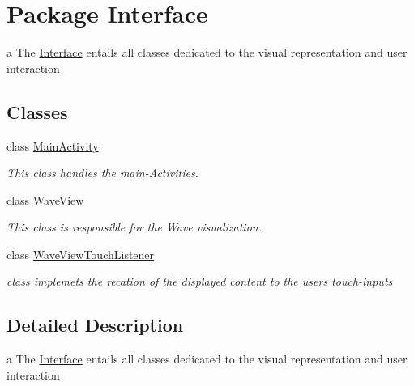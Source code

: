 \hypertarget{namespaceInterface}{}\section{Package Interface}
\label{namespaceInterface}


a The \hyperlink{namespaceInterface}{Interface} entails all classes dedicated to the visual representation and user interaction  


\subsection*{Classes}
\begin{DoxyCompactItemize}
\item 
class \hyperlink{classInterface_1_1MainActivity}{Main\+Activity}
\begin{DoxyCompactList}\small\item\em This class handles the main-\/\+Activities. \end{DoxyCompactList}\item 
class \hyperlink{classInterface_1_1WaveView}{Wave\+View}
\begin{DoxyCompactList}\small\item\em This class is responsible for the Wave visualization. \end{DoxyCompactList}\item 
class \hyperlink{classInterface_1_1WaveViewTouchListener}{Wave\+View\+Touch\+Listener}
\begin{DoxyCompactList}\small\item\em class implemets the recation of the displayed content to the users touch-\/inputs \end{DoxyCompactList}\end{DoxyCompactItemize}


\subsection{Detailed Description}
a The \hyperlink{namespaceInterface}{Interface} entails all classes dedicated to the visual representation and user interaction 